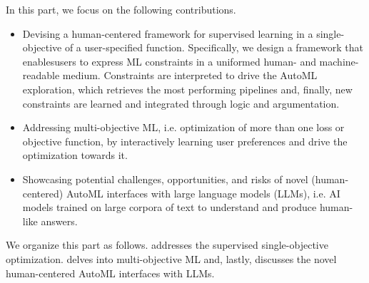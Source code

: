 In this part, we focus on the following contributions.
\begin{itemize}
    \item Devising a human-centered framework for supervised learning in a single-objective of a user-specified function.
    Specifically, we design a framework that enablesusers to express ML constraints in a uniformed human- and machine-readable medium.
    Constraints are interpreted to drive the AutoML exploration, which retrieves the most performing pipelines and, finally, new constraints are learned and integrated through logic and argumentation.
    \item Addressing multi-objective ML, i.e. optimization of more than one loss or objective function, by interactively learning user preferences and drive the optimization towards it.
    \item Showcasing potential challenges, opportunities, and risks of novel (human-centered) AutoML interfaces with large language models (LLMs), i.e. AI models trained on large corpora of text to understand and produce human-like answers.
\end{itemize}

We organize this part as follows.
 addresses the supervised single-objective optimization.
 delves into multi-objective ML and, lastly,  discusses the novel human-centered AutoML interfaces with LLMs.

